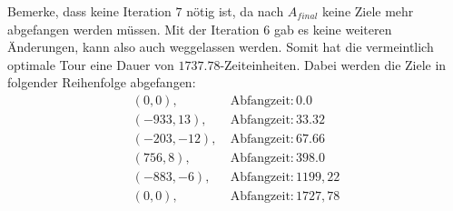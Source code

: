\documentclass{scrartcl}
\begin{document}
Bemerke, dass keine Iteration $7$ nötig ist, da nach $A_{final}$ keine Ziele mehr abgefangen werden müssen. Mit der Iteration $6$ gab es keine weiteren Änderungen, kann also auch weggelassen werden. Somit hat die vermeintlich optimale Tour eine Dauer von $1737.78$-Zeiteinheiten. Dabei werden die Ziele in folgender Reihenfolge abgefangen:
\begin{align*}
(0,0),~ &\text{Abfangzeit}: 0.0 \\
(-933, 13),~ &\text{Abfangzeit}: 33.32 \\
(-203, -12),~ &\text{Abfangzeit}: 67.66 \\
(756, 8),~ &\text{Abfangzeit}: 398.0 \\
(-883, -6),~ &\text{Abfangzeit}: 1199,22 \\
(0, 0),~ &\text{Abfangzeit}: 1727,78 
\end{align*}
\end{document}
